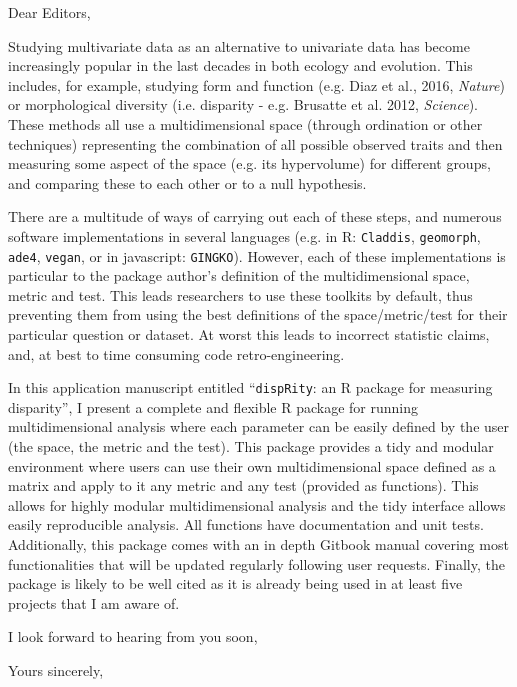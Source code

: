 \documentclass[11pt]{letter}
\begin{document}
\begin{letter}{}
\opening{Dear Editors,}

Studying multivariate data as an alternative to univariate data has become increasingly popular in the last decades in both ecology and evolution.
This includes, for example, studying form and function (e.g. Diaz et al., 2016, \textit{Nature}) or morphological diversity (i.e. disparity - e.g. Brusatte et al. 2012, \textit{Science}).
These methods all use a multidimensional space (through ordination or other techniques) representing the combination of all possible observed traits and then measuring some aspect of the space (e.g. its hypervolume) for different groups, and comparing these to each other or to a null hypothesis.

There are a multitude of ways of carrying out each of these steps, and numerous software implementations in several languages (e.g. in R: \texttt{Claddis}, \texttt{geomorph}, \texttt{ade4}, \texttt{vegan}, or in javascript: \texttt{GINGKO}).
However, each of these implementations is particular to the package author's definition of the multidimensional space, metric and test.
This leads researchers to use these toolkits by default, thus preventing them from using the best definitions of the space/metric/test for their particular question or dataset.
At worst this leads to incorrect statistic claims, and, at best to time consuming code retro-engineering.

In this application manuscript entitled ``\texttt{dispRity}: an R package for measuring disparity'', I present a complete and flexible R package for running multidimensional analysis where each parameter can be easily defined by the user (the space, the metric and the test).
This package provides a tidy and modular environment where users can use their own multidimensional space defined as a matrix and apply to it any metric and any test (provided as functions).
This allows for highly modular multidimensional analysis and the tidy interface allows easily reproducible analysis.
All functions have documentation and unit tests. 
Additionally, this package comes with an in depth Gitbook manual covering most functionalities that will be updated regularly following user requests. 
Finally, the package is likely to be well cited as it is already being used in at least five projects that I am aware of.

I look forward to hearing from you soon,

\closing{Yours sincerely,}

\end{letter}
\end{document}
